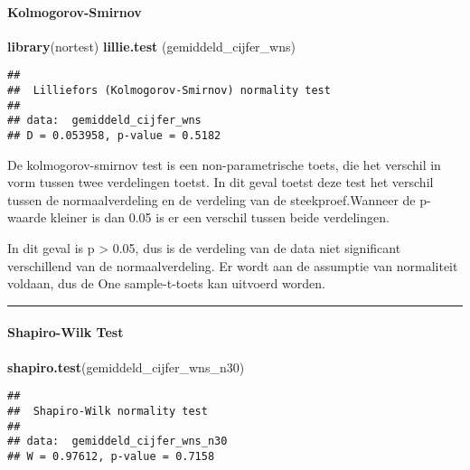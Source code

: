\documentclass[]{article}
\newenvironment{Shaded}{\begin{snugshade}}{\end{snugshade}}
\newcommand{\KeywordTok}[1]{\textcolor[rgb]{0.13,0.29,0.53}{\textbf{#1}}}
\newcommand{\NormalTok}[1]{#1}
\let\oldparagraph\paragraph
\renewcommand{\paragraph}[1]{\oldparagraph{#1}\mbox{}}
\begin{document}
\hypertarget{kolmogorov-smirnov}{%
\paragraph{Kolmogorov-Smirnov}\label{kolmogorov-smirnov}}

\begin{Shaded}
\begin{Highlighting}[]
\KeywordTok{library}\NormalTok{(nortest)}
\KeywordTok{lillie.test}\NormalTok{ (gemiddeld_cijfer_wns)}
\end{Highlighting}
\end{Shaded}

\begin{verbatim}
## 
##  Lilliefors (Kolmogorov-Smirnov) normality test
## 
## data:  gemiddeld_cijfer_wns
## D = 0.053958, p-value = 0.5182
\end{verbatim}

De kolmogorov-smirnov test is een non-parametrische toets, die het
verschil in vorm tussen twee verdelingen toetst. In dit geval toetst
deze test het verschil tussen de normaalverdeling en de verdeling van de
steekproef.Wanneer de p-waarde kleiner is dan 0.05 is er een verschil
tussen beide verdelingen.

In dit geval is p \textgreater{} 0.05, dus is de verdeling van de data
niet significant verschillend van de normaalverdeling. Er wordt aan de
assumptie van normaliteit voldaan, dus de One sample-t-toets kan
uitvoerd worden.

\begin{center}\rule{0.5\linewidth}{\linethickness}\end{center}

\hypertarget{shapiro-wilk-test}{%
\paragraph{Shapiro-Wilk Test}\label{shapiro-wilk-test}}

\begin{Shaded}
\begin{Highlighting}[]
\KeywordTok{shapiro.test}\NormalTok{(gemiddeld_cijfer_wns_n30)}
\end{Highlighting}
\end{Shaded}

\begin{verbatim}
## 
##  Shapiro-Wilk normality test
## 
## data:  gemiddeld_cijfer_wns_n30
## W = 0.97612, p-value = 0.7158
\end{verbatim}
\end{document}
